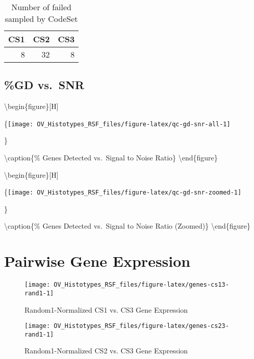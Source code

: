 \documentclass[
]{report}
\begin{document}
\begin{table}

\caption{\label{tab:qc-failed}Number of failed sampled by CodeSet}
\centering
\begin{tabular}[t]{r|r|r}
\hline
CS1 & CS2 & CS3\\
\hline
8 & 32 & 8\\
\hline
\end{tabular}
\end{table}

\hypertarget{gd-vs.-snr}{%
\subsection{\%GD vs.~SNR}\label{gd-vs.-snr}}

\textbackslash begin\{figure\}{[}H{]}

\{\centering \texttt{[image: OV\_Histotypes\_RSF\_files/figure-latex/qc-gd-snr-all-1]}

\}

\textbackslash caption\{\% Genes Detected vs.~Signal to Noise Ratio\}\label{fig:qc-gd-snr-all}
\textbackslash end\{figure\}

\textbackslash begin\{figure\}{[}H{]}

\{\centering \texttt{[image: OV\_Histotypes\_RSF\_files/figure-latex/qc-gd-snr-zoomed-1]}

\}

\textbackslash caption\{\% Genes Detected vs.~Signal to Noise Ratio (Zoomed)\}\label{fig:qc-gd-snr-zoomed}
\textbackslash end\{figure\}

\hypertarget{pairwise-gene-expression}{%
\section{Pairwise Gene Expression}\label{pairwise-gene-expression}}

\begin{figure}[H]

{\centering \texttt{[image: OV\_Histotypes\_RSF\_files/figure-latex/genes-cs13-rand1-1]} 

}

\caption{Random1-Normalized CS1 vs. CS3 Gene Expression}\label{fig:genes-cs13-rand1}
\end{figure}

\begin{figure}[H]

{\centering \texttt{[image: OV\_Histotypes\_RSF\_files/figure-latex/genes-cs23-rand1-1]} 

}

\caption{Random1-Normalized CS2 vs. CS3 Gene Expression}\label{fig:genes-cs23-rand1}
\end{figure}
\end{document}
